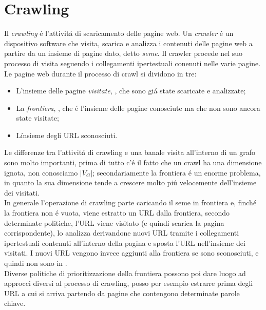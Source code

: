 \section{Crawling}
Il \textit{crawling} é l'attivitá di scaricamento delle pagine web. Un \textit{crawler} é un dispositivo software che visita, scarica e analizza i contenuti delle pagine web a partire da un insieme di pagine dato, detto \textit{seme}. Il crawler procede nel suo processo di visita seguendo i collegamenti ipertestuali conenuti nelle varie pagine.\\
Le pagine web durante il processo di crawl si dividono in tre:
\begin{itemize}
    \item L'insieme delle pagine \textit{visitate}, , che sono giá state scaricate e analizzate;
    \item La \textit{frontiera}, , che é l'insieme delle pagine conosciute ma che non sono ancora state visitate;
    \item Línsieme  degli URL sconosciuti.
\end{itemize}
Le differenze tra l'attivitá di crawling e una banale visita all'interno di un grafo sono molto importanti, prima di tutto c'é il fatto che un crawl ha una dimensione ignota, non conosciamo $|V_G|$; secondariamente la frontiera é un enorme problema, in quanto la sua dimensione tende a crescere molto piú velocemente dell'insieme dei visitati.\\
In generale l'operazione di crawling parte caricando il seme in frontiera e, finché la frontiera non é vuota, viene estratto un URL dalla frontiera, secondo determinate politiche, l'URL viene visitato (e quindi scarica la pagina corrispondente), lo analizza derivandone nuovi URL tramite i collegamenti ipertestuali contenuti all'interno della pagina e sposta l'URL nell'insieme dei visitati. I nuovi URL vengono invece aggiunti alla frontiera se sono sconosciuti, e quindi non sono in .\\
Diverse politiche di prioritizzazione della frontiera possono poi dare luogo ad approcci diversi al processo di crawling, posso per esempio estrarre prima degli URL a cui si arriva partendo da pagine che contengono determinate parole chiave.

